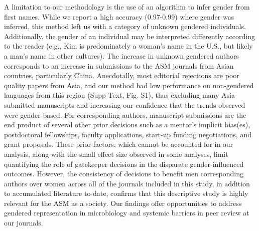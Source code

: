 \documentclass[11pt,]{article}
\begin{document}
A limitation to our methodology is the use of an algorithm to infer
gender from first names. While we report a high accuracy (0.97-0.99)
where gender was inferred, this method left us with a category of
unknown gendered individuals. Additionally, the gender of an individual
may be interpreted differently according to the reader (e.g., Kim is
predominately a woman's name in the U.S., but likely a man's name in
other cultures). The increase in unknown gendered authors corresponds to
an increase in submissions to the ASM journals from Asian countries,
particularly China. Anecdotally, most editorial rejections are poor
quality papers from Asia, and our method had low performance on
non-gendered languages from this region (Supp Text, Fig. S1), thus
excluding many Asia-submitted manuscripts and increasing our confidence
that the trends observed were gender-based. For corresponding authors,
manuscript submissions are the end product of several other prior
decisions such as a mentor's implicit bias(es), postdoctoral
fellowships, faculty applications, start-up funding negotiations, and
grant proposals. These prior factors, which cannot be accounted for in
our analysis, along with the small effect size observed in some
analyses, limit quantifying the role of gatekeeper decisions in the
disparate gender-influenced outcomes. However, the consistency of
decisions to benefit men corresponding authors over women across all of
the journals included in this study, in addition to accumulated
literature to-date, confirms that this descriptive study is highly
relevant for the ASM as a society. Our findings offer opportunities to
address gendered representation in microbiology and systemic barriers in
peer review at our journals.
\end{document}
